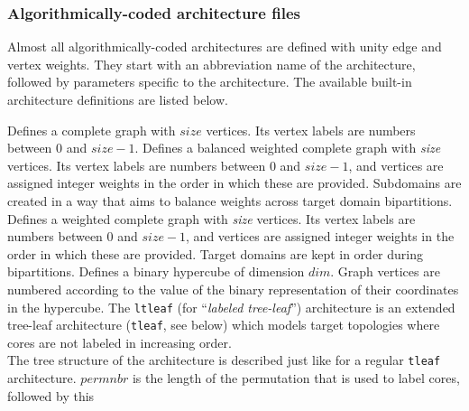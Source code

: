 \subsubsection{Algorithmically-coded architecture files}
\label{sec-file-target-algo}

Almost all algorithmically-coded architectures are defined with unity
edge and vertex weights. They start with an abbreviation name of the
architecture, followed by parameters specific to the architecture. The
available built-in architecture definitions are listed below.
\begin{itemize}
Defines a complete graph with $\mathit{size}$ vertices.
Its vertex labels are numbers between $0$ and $\mathit{size} - 1$.
Defines a balanced weighted complete graph with {\it size\/} vertices.
Its vertex labels are numbers between $0$ and $\mathit{size} - 1$,
and vertices are assigned integer weights in the order in which
these are provided. Subdomains are created in a way that aims to
balance weights across target domain bipartitions.
Defines a weighted complete graph with {\it size\/} vertices.
Its vertex labels are numbers between $0$ and $\mathit{size} - 1$,
and vertices are assigned integer weights in the order in which
these are provided. Target domains are kept in order during
bipartitions.
Defines a binary hypercube of dimension $\mathit{dim}$.
Graph vertices are numbered according to the value of the binary
representation of their coordinates in the hypercube.
\label{sec-file-target-ltleaf}
The \texttt{ltleaf} (for ``\textit{labeled tree-leaf}'') architecture is
an extended tree-leaf architecture (\texttt{tleaf}, see below) which
models target topologies where cores are not labeled in increasing
order.
\\
The tree structure of the architecture is described just like for a
regular \texttt{tleaf} architecture. $\mathit{permnbr}$ is the length
of the permutation that is used to label cores, followed by this

\end{itemize}
